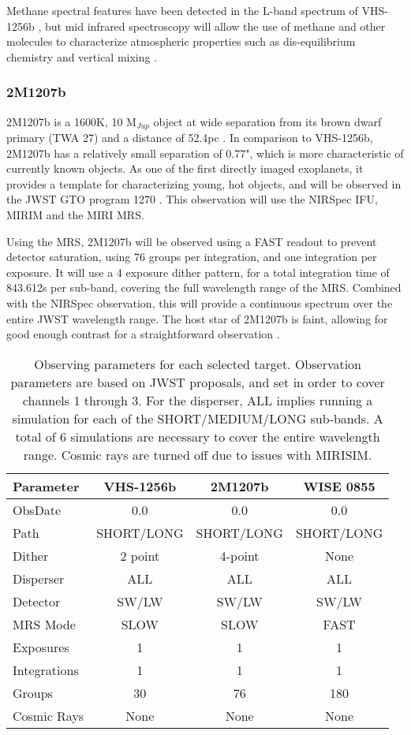 Methane spectral features have been detected in the L-band spectrum of VHS-1256b \parencite{Miles2018}, but mid infrared spectroscopy will allow the use of methane and other molecules to characterize atmospheric properties such as dis-equilibrium chemistry and vertical mixing \parencite{Beichman2019}. 
\subsubsection{2M1207b}
2M1207b is a 1600K, 10 M$_{Jup}$ object at wide separation from its brown dwarf primary (TWA 27) and a distance of 52.4pc \parencite{Bowler2016}.
In comparison to VHS-1256b, 2M1207b has a relatively small separation of 0.77", which is more characteristic of currently known objects.
As one of the first directly imaged exoplanets, it provides a template for characterizing young, hot objects, and will be observed in the JWST GTO program 1270 \parencite{Birkmann2019}.
This observation will use the NIRSpec IFU, MIRIM and the MIRI MRS.

Using the MRS, 2M1207b will be observed using a FAST readout to prevent detector saturation, using 76 groups per integration, and one integration per exposure. 
It will use a 4 exposure dither pattern, for a total integration time of 843.612s per sub-band, covering the full wavelength range of the MRS. 
Combined with the NIRSpec observation, this will provide a continuous spectrum over the entire JWST wavelength range.
The host star of 2M1207b is faint, allowing for good enough contrast for a straightforward observation \parencite{Beichman2019}.

\begin{table}[t]
	\centering
	\begin{tabular}{l|ccc}
		\toprule
		\textbf{Parameter} & \textbf{VHS-1256b} & \textbf{2M1207b} & \textbf{WISE 0855}\\
		\midrule
		ObsDate & 0.0 & 0.0 & 0.0\\
		Path & SHORT/LONG & SHORT/LONG & SHORT/LONG\\
		Dither & 2 point & 4-point & None\\
		Disperser & ALL & ALL & ALL\\
		Detector & SW/LW & SW/LW & SW/LW\\
		MRS Mode & SLOW & SLOW & FAST\\
		Exposures & 1 & 1 & 1\\
		Integrations & 1 & 1 & 1\\
		Groups & 30 & 76 & 180\\
		Cosmic Rays & None & None & None\\
		\bottomrule
	\end{tabular}
	\caption[Observation Parameters]{Observing parameters for each selected target. Observation parameters are based on JWST proposals, and set in order to cover channels 1 through 3. For the disperser, ALL implies running a simulation for each of the SHORT/MEDIUM/LONG sub-bands. A total of 6 simulations are necessary to cover the entire wavelength range. Cosmic rays are turned off due to issues with MIRISIM.}
	\label{tab:obsparams}
\end{table}
